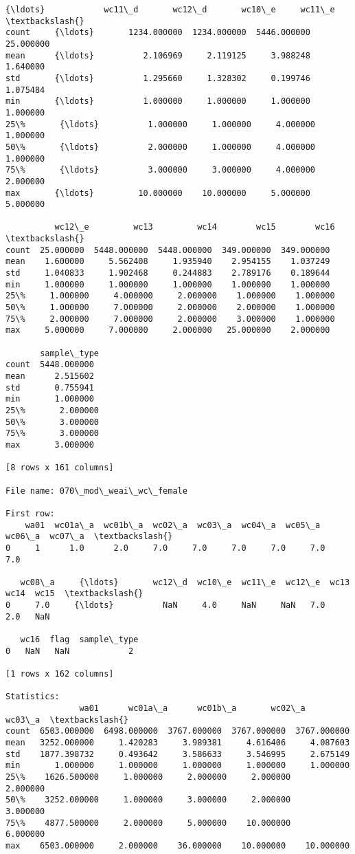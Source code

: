 \documentclass[11pt]{article}
\begin{document}
\begin{Verbatim}[commandchars=\\\{\}]
          {\ldots}            wc11\_d       wc12\_d       wc10\_e     wc11\_e  \textbackslash{}
count     {\ldots}       1234.000000  1234.000000  5446.000000  25.000000   
mean      {\ldots}          2.106969     2.119125     3.988248   1.640000   
std       {\ldots}          1.295660     1.328302     0.199746   1.075484   
min       {\ldots}          1.000000     1.000000     1.000000   1.000000   
25\%       {\ldots}          1.000000     1.000000     4.000000   1.000000   
50\%       {\ldots}          2.000000     1.000000     4.000000   1.000000   
75\%       {\ldots}          3.000000     3.000000     4.000000   2.000000   
max       {\ldots}         10.000000    10.000000     5.000000   5.000000   

          wc12\_e         wc13         wc14        wc15        wc16  \textbackslash{}
count  25.000000  5448.000000  5448.000000  349.000000  349.000000   
mean    1.600000     5.562408     1.935940    2.954155    1.037249   
std     1.040833     1.902468     0.244883    2.789176    0.189644   
min     1.000000     1.000000     1.000000    1.000000    1.000000   
25\%     1.000000     4.000000     2.000000    1.000000    1.000000   
50\%     1.000000     7.000000     2.000000    2.000000    1.000000   
75\%     2.000000     7.000000     2.000000    3.000000    1.000000   
max     5.000000     7.000000     2.000000   25.000000    2.000000   

       sample\_type  
count  5448.000000  
mean      2.515602  
std       0.755941  
min       1.000000  
25\%       2.000000  
50\%       3.000000  
75\%       3.000000  
max       3.000000  

[8 rows x 161 columns]

File name: 070\_mod\_weai\_wc\_female

First row: 
    wa01  wc01a\_a  wc01b\_a  wc02\_a  wc03\_a  wc04\_a  wc05\_a  wc06\_a  wc07\_a  \textbackslash{}
0     1      1.0      2.0     7.0     7.0     7.0     7.0     7.0     7.0   

   wc08\_a     {\ldots}       wc12\_d  wc10\_e  wc11\_e  wc12\_e  wc13  wc14  wc15  \textbackslash{}
0     7.0     {\ldots}          NaN     4.0     NaN     NaN   7.0   2.0   NaN   

   wc16  flag  sample\_type  
0   NaN   NaN            2  

[1 rows x 162 columns]

Statistics: 
               wa01      wc01a\_a      wc01b\_a       wc02\_a       wc03\_a  \textbackslash{}
count  6503.000000  6498.000000  3767.000000  3767.000000  3767.000000   
mean   3252.000000     1.420283     3.989381     4.616406     4.087603   
std    1877.398732     0.493642     3.586633     3.546995     2.675149   
min       1.000000     1.000000     1.000000     1.000000     1.000000   
25\%    1626.500000     1.000000     2.000000     2.000000     2.000000   
50\%    3252.000000     1.000000     3.000000     2.000000     3.000000   
75\%    4877.500000     2.000000     5.000000    10.000000     6.000000   
max    6503.000000     2.000000    36.000000    10.000000    10.000000   


\end{Verbatim}
\end{document}
